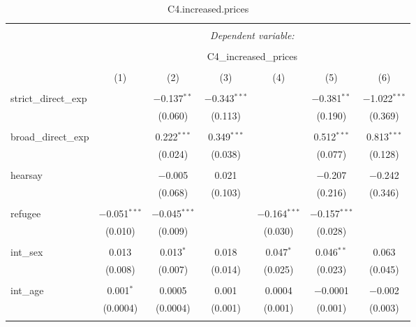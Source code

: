 
\begin{table}[H] \centering 
  \caption{C4.increased.prices} 
  \label{} 
\tiny 
\begin{tabular}{@{\extracolsep{4pt}}lcccccc} 
\\[-1.8ex]\hline 
\hline \\[-1.8ex] 
 & \multicolumn{6}{c}{\textit{Dependent variable:}} \\ 
\cline{2-7} 
\\[-1.8ex] & \multicolumn{6}{c}{C4\_increased\_prices} \\ 
\\[-1.8ex] & (1) & (2) & (3) & (4) & (5) & (6)\\ 
\hline \\[-1.8ex] 
 strict\_direct\_exp &  & $-$0.137$^{**}$ & $-$0.343$^{***}$ &  & $-$0.381$^{**}$ & $-$1.022$^{***}$ \\ 
  &  & (0.060) & (0.113) &  & (0.190) & (0.369) \\ 
  & & & & & & \\ 
 broad\_direct\_exp &  & 0.222$^{***}$ & 0.349$^{***}$ &  & 0.512$^{***}$ & 0.813$^{***}$ \\ 
  &  & (0.024) & (0.038) &  & (0.077) & (0.128) \\ 
  & & & & & & \\ 
 hearsay &  & $-$0.005 & 0.021 &  & $-$0.207 & $-$0.242 \\ 
  &  & (0.068) & (0.103) &  & (0.216) & (0.346) \\ 
  & & & & & & \\ 
 refugee & $-$0.051$^{***}$ & $-$0.045$^{***}$ &  & $-$0.164$^{***}$ & $-$0.157$^{***}$ &  \\ 
  & (0.010) & (0.009) &  & (0.030) & (0.028) &  \\ 
  & & & & & & \\ 
 int\_sex & 0.013 & 0.013$^{*}$ & 0.018 & 0.047$^{*}$ & 0.046$^{**}$ & 0.063 \\ 
  & (0.008) & (0.007) & (0.014) & (0.025) & (0.023) & (0.045) \\ 
  & & & & & & \\ 
 int\_age & 0.001$^{*}$ & 0.0005 & 0.001 & 0.0004 & $-$0.0001 & $-$0.002 \\ 
  & (0.0004) & (0.0004) & (0.001) & (0.001) & (0.001) & (0.003) \\ 
  & & & & & & \\ 

\end{tabular}
\end{table}
